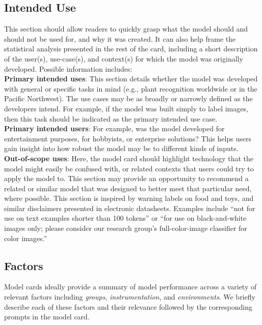 \subsection{Intended Use}
This section should allow readers to quickly grasp what the model should and should not be used for, and why it was created. 
It can also help frame the statistical analysis presented in the rest of the card, including a short description of the user(s), use-case(s), and context(s) for which the model was originally developed. Possible information includes: \\
{\bf Primary intended uses}: This section details whether the model was developed with general or specific tasks in mind (e.g., plant recognition worldwide or in the Pacific Northwest). The use cases may be as broadly or narrowly defined as the developers intend. For example, if the model was built simply to label images, then this task should be indicated as the primary intended use case. \\
{\bf Primary intended users}:  For example, was the model developed for entertainment purposes, for hobbyists, or enterprise solutions?  This helps users gain insight into how robust the model may be to different kinds of inputs. \\
{\bf Out-of-scope uses}: 
Here, the model card should highlight technology that the model might easily be confused with, or related contexts that users could try to apply the model to. This section may provide an opportunity to recommend a related or similar model that was designed to better meet that particular need, where possible. This section is inspired by warning labels on food and toys, and similar disclaimers presented in electronic datasheets. Examples include ``not for use on text examples shorter than 100 tokens'' or ``for use on black-and-white images only; please consider our research group's full-color-image classifier for color images.'' 


\subsection{Factors}\label{sec:factors}

Model cards ideally provide a summary of model performance across a variety of relevant factors including {\it groups}, {\it instrumentation}, and {\it environments}. We briefly describe each of these factors and their relevance followed by the corresponding prompts in the model card.

